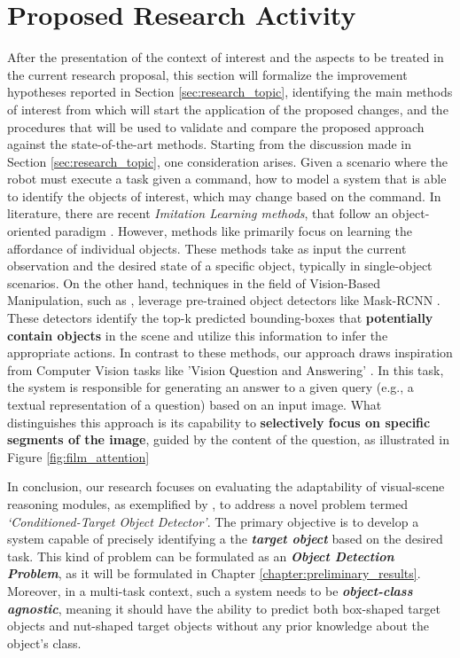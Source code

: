 \section{Proposed Research Activity}
\label{sec:research_activity}
After the presentation of the context of interest and the aspects to be treated in the current research proposal, this section will formalize the improvement hypotheses reported in Section \ref{sec:research_topic}, identifying the main methods of interest from which will start the application of the proposed changes, and the procedures that will be used to validate and compare the proposed approach against the state-of-the-art methods.
Starting from the discussion made in Section \ref{sec:research_topic}, one consideration arises. Given a scenario where the robot must execute a task given a command, how to model a system that is able to identify the objects of interest, which may change based on the command.
In literature, there are recent \textit{Imitation Learning methods}, that follow an object-oriented paradigm \cite{park2021object, belkhale2023plato, zhu2023viola, jiang2023vima}. However, methods like \cite{belkhale2023plato} primarily focus on learning the affordance of individual objects. These methods take as input the current observation and the desired state of a specific object, typically in single-object scenarios. On the other hand, techniques in the field of Vision-Based Manipulation, such as \cite{zhu2023viola, jiang2023vima}, leverage pre-trained object detectors like Mask-RCNN \cite{he2017mask}. These detectors identify the top-k predicted bounding-boxes that \textbf{potentially contain objects} in the scene and utilize this information to infer the appropriate actions. In contrast to these methods, our approach draws inspiration from Computer Vision tasks like 'Vision Question and Answering' \cite{perez2018film}. In this task, the system is responsible for generating an answer to a given query (e.g., a textual representation of a question) based on an input image. What distinguishes this approach is its capability to \textbf{selectively focus on specific segments of the image}, guided by the content of the question, as illustrated in Figure \ref{fig:film_attention}

In conclusion, our research focuses on evaluating the adaptability of visual-scene reasoning modules, as exemplified by \cite{perez2018film}, to address a novel problem termed \textit{`Conditioned-Target Object Detector'}. The primary objective is to develop a system capable of precisely identifying a the \textit{\textbf{target object}} based on the desired task. This kind of problem can be formulated as an \textbf{\textit{Object Detection Problem}}, as it will be formulated in Chapter \ref{chapter:preliminary_results}. Moreover, in a multi-task context, such a system needs to be \textit{\textbf{object-class agnostic}}, meaning it should have the ability to predict both box-shaped target objects and nut-shaped target objects without any prior knowledge about the object's class.
